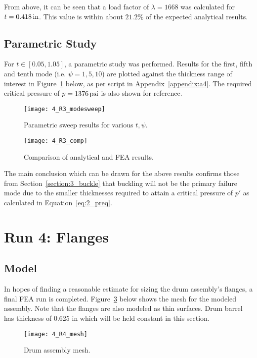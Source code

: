 From above, it can be seen that a load factor of $\lambda = 1668$ was calculated for $t= 0.418\,\mathrm{in}$. This value is within about $21.2\%$ of the expected analytical results.

\subsection{Parametric Study}

For $t\in [0.05, 1.05]$, a parametric study was performed. Results for the first, fifth and tenth mode (i.e. $\psi = 1, 5, 10$) are plotted against the thickness range of interest in Figure~\ref{fig:4_R3_modesweep} below, as per \cite{PYTHON} script in Appendix~\ref{appendix:a4}. The required critical pressure of $p =1376\,\mathrm{psi}$ is also shown for reference.

\begin{figure}[H]
	\centering
	\texttt{[image: 4\_R3\_modesweep]}
	\caption{Parametric sweep results for various $t, \psi$.}
	\label{fig:4_R3_modesweep}
\end{figure}

\begin{figure}[H]
	\centering
	\texttt{[image: 4\_R3\_comp]}
	\caption{Comparison of analytical and FEA results.}
	\label{fig:4_R3_comp}
\end{figure}


The main conclusion which can be drawn for the above results confirms those from Section~\ref{section:3_buckle} that buckling will not be the primary failure mode due to the smaller thicknesses required to attain a critical pressure of $p'$ as calculated in Equation~\ref{eq:2_preq}.

\section{Run 4: Flanges}
\label{section:4_R4}
\subsection{Model}

In hopes of finding a reasonable estimate for sizing the drum assembly's flanges, a final FEA run is completed. Figure~\ref{fig:4_R4_mesh} below shows the mesh for the modeled assembly. Note that the flanges are also modeled as thin surfaces. Drum barrel has thickness of 0.625 in which will be held constant in this section.
\begin{figure}[H]
	\centering
	\texttt{[image: 4\_R4\_mesh]}
	\caption{Drum assembly mesh.}
	\label{fig:4_R4_mesh}
\end{figure}

